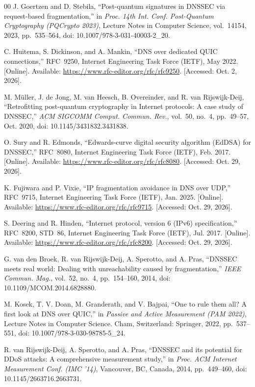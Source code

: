 \documentclass[conference]{IEEEtran}
\begin{document}
\begin{thebibliography}{00}
 J. Goertzen and D. Stebila, ``Post-quantum signatures in DNSSEC via request-based fragmentation,'' in \emph{Proc. 14th Int. Conf. Post-Quantum Cryptography (PQCrypto 2023)}, Lecture Notes in Computer Science, vol.~14154, 2023, pp.~535--564, doi: 10.1007/978-3-031-40003-2\_20.

 C. Huitema, S. Dickinson, and A. Mankin, ``DNS over dedicated QUIC connections,'' RFC~9250, Internet Engineering Task Force (IETF), May 2022. [Online]. Available: \url{https://www.rfc-editor.org/rfc/rfc9250}. [Accessed: Oct. 2, 2026].

 M. M\"uller, J. de Jong, M. van Heesch, B. Overeinder, and R. van Rijswijk-Deij, ``Retrofitting post-quantum cryptography in Internet protocols: A case study of DNSSEC,'' \emph{ACM SIGCOMM Comput. Commun. Rev.}, vol.~50, no.~4, pp.~49--57, Oct. 2020, doi: 10.1145/3431832.3431838.

 O. Sury and R. Edmonds, ``Edwards-curve digital security algorithm (EdDSA) for DNSSEC,'' RFC~8080, Internet Engineering Task Force (IETF), Feb. 2017. [Online]. Available: \url{https://www.rfc-editor.org/rfc/rfc8080}. [Accessed: Oct. 29, 2026].

 K. Fujiwara and P. Vixie, ``IP fragmentation avoidance in DNS over UDP,'' RFC~9715, Internet Engineering Task Force (IETF), Jan. 2025. [Online]. Available: \url{https://www.rfc-editor.org/rfc/rfc9715}. [Accessed: Oct. 29, 2026].

 S. Deering and R. Hinden, ``Internet protocol, version 6 (IPv6) specification,'' RFC~8200, STD~86, Internet Engineering Task Force (IETF), Jul. 2017. [Online]. Available: \url{https://www.rfc-editor.org/rfc/rfc8200}. [Accessed: Oct. 29, 2026].

 G. van den Broek, R. van Rijswijk-Deij, A. Sperotto, and A. Pras, ``DNSSEC meets real world: Dealing with unreachability caused by fragmentation,'' \emph{IEEE Commun. Mag.}, vol.~52, no.~4, pp.~154--160, 2014, doi: 10.1109/MCOM.2014.6828880.

 M. Kosek, T. V. Doan, M. Granderath, and V. Bajpai, ``One to rule them all? A first look at DNS over QUIC,'' in \emph{Passive and Active Measurement (PAM 2022)}, Lecture Notes in Computer Science. Cham, Switzerland: Springer, 2022, pp.~537--551, doi: 10.1007/978-3-030-98785-5\_24.

 R. van Rijswijk-Deij, A. Sperotto, and A. Pras, ``DNSSEC and its potential for DDoS attacks: A comprehensive measurement study,'' in \emph{Proc. ACM Internet Measurement Conf. (IMC '14)}, Vancouver, BC, Canada, 2014, pp.~449--460, doi: 10.1145/2663716.2663731.


\end{thebibliography}
\end{document}
